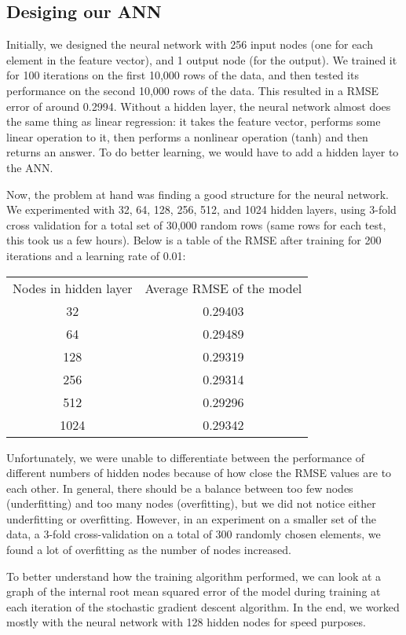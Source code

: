 \documentclass{article}
\begin{document}
\subsection{Desiging our ANN}
Initially, we designed the neural network with 256 input nodes
 (one for each element in the feature vector), and 1 output node
  (for the output).  We trained it for 100 iterations on the first 
  10,000 rows of the data, and then tested its performance on the 
  second 10,000 rows of the data.  This resulted in a RMSE error of
   around 0.2994.  Without a hidden layer, the neural network almost
    does the same thing as linear regression: it takes the feature
     vector, performs some linear operation to it, then performs a 
     nonlinear operation (tanh) and then returns an answer.  To do better
      learning, we would have to add a hidden layer to the ANN.

Now, the problem at hand was finding a good structure for the neural network. 
 We experimented with 
32, 64, 128, 256, 512, and 1024 hidden layers, using 3-fold cross
validation for a total set of 30,000 random rows (same rows for each test,
this took us a few hours).
Below is a table of the RMSE after training for 200 iterations and
a learning rate of 0.01:

\begin{tabular}{ c | c }
  Nodes in hidden layer & Average RMSE of the model  \\
  32 & 0.29403  \\
  64 & 0.29489  \\
  128 & 0.29319 \\
  256 & 0.29314 \\
  512 & 0.29296 \\
  1024 & 0.29342 \\
\end{tabular}

Unfortunately, we were unable to differentiate between 
the performance of different numbers of hidden nodes because 
of how close the RMSE values are to each other.  In general,
there should be a balance between too few nodes (underfitting)
and too many nodes (overfitting), but we did not notice
either underfitting or overfitting.  However, in an experiment
on a smaller set of the data, a 3-fold cross-validation on a total of
300 randomly chosen elements, we found a lot of overfitting as the number of
nodes increased.

To better understand how the training algorithm performed,
we can look at a graph of the internal root mean squared error
of the model during training at each iteration of the stochastic
gradient descent algorithm.  In the end, we worked mostly with
the neural network with 128 hidden nodes for speed purposes.
\end{document}
